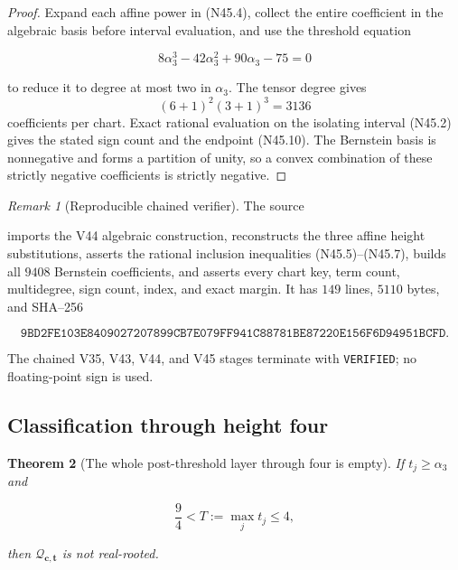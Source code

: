 \documentclass[11pt]{article}
\newtheorem{theorem}{Theorem}[section]
\theoremstyle{definition}
\theoremstyle{remark}
\newtheorem{remark}[theorem]{Remark}
\begin{document}
\begin{proof}
Expand each affine power in \textup{(N45.4)}, collect the entire
coefficient in the algebraic basis before interval evaluation, and use
the threshold equation

\[
 8\alpha_3^3-42\alpha_3^2+90\alpha_3-75=0
\tag{N45.11}
\]

to reduce it to degree at most two in \(\alpha_3\).  The tensor degree
gives
\[
 (6+1)^2(3+1)^3=3136
\]
coefficients per chart.  Exact rational evaluation on the isolating
interval \textup{(N45.2)} gives the stated sign count and the endpoint
\textup{(N45.10)}.  The Bernstein basis is nonnegative and forms a
partition of unity, so a convex combination of these strictly negative
coefficients is strictly negative.
\end{proof}

\begin{remark}[Reproducible chained verifier]
\label{rem:f2v45-verifier}
The source
\begin{center}
\end{center}
imports the V44 algebraic construction, reconstructs the three affine
height substitutions, asserts the rational inclusion inequalities
\textup{(N45.5)}--\textup{(N45.7)}, builds all \(9408\) Bernstein
coefficients, and asserts every chart key, term count, multidegree, sign
count, index, and exact margin.  It has \(149\) lines, \(5110\) bytes,
and SHA--256

\[
 \texttt{9BD2FE103E8409027207899CB7E079FF}
 \allowbreak\texttt{941C88781BE87220E156F6D94951BCFD}.
\tag{N45.12}
\]

The chained V35, V43, V44, and V45 stages terminate with
\texttt{VERIFIED}; no floating-point sign is used.
\end{remark}

\subsection{Classification through height four}

\begin{theorem}[The whole post-threshold layer through four is empty]
\label{thm:f2v45-post-threshold-empty}
If \(t_j\geq\alpha_3\) and

\[
 \frac94<T:=\max_jt_j\leq4,
\tag{N45.13}
\]

then \(\mathcal Q_{\bm c,\bm t}\) is not real-rooted.
\end{theorem}
\end{document}
